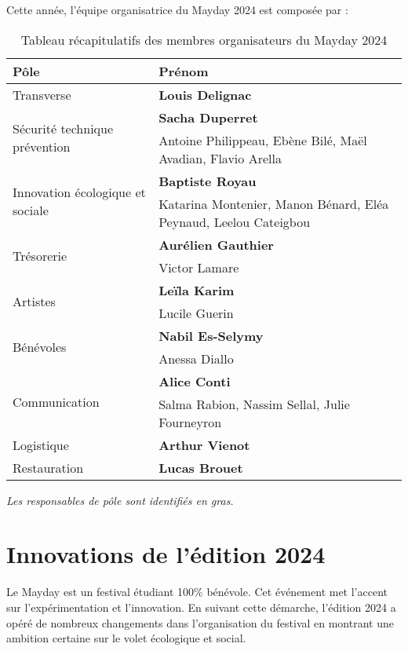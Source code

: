 \documentclass[12pt,a4paper]{report}
\begin{document}
\newpage
Cette année, l'équipe organisatrice du Mayday 2024 est composée par :

\begin{table}[h!]
\centering
\begin{tabular}{|m{3cm}|m{10cm}|}
\hline
Pôle & Prénom \\ 
 \hline\hline
Transverse & \textbf{Louis Delignac}\\ 
\hline
\multirow{2}{10em}{Sécurité technique prévention} & \textbf{Sacha Duperret} \\ 
& Antoine Philippeau, Ebène Bilé, Maël Avadian, Flavio Arella\\ 
 \hline
 \multirow{2}{5em}{Innovation écologique et sociale} & \textbf{Baptiste Royau} \\ 
& Katarina Montenier, Manon Bénard, Eléa Peynaud, Leelou Cateigbou\\
 \hline
 \multirow{2}{5em}{Trésorerie} & \textbf{Aurélien Gauthier} \\ 
& Victor Lamare\\
 \hline
 \multirow{2}{5em}{Artistes} & \textbf{Leïla Karim} \\
& Lucile Guerin\\
 \hline
\multirow{2}{5em}{Bénévoles} & \textbf{Nabil Es-Selymy} \\ 
& Anessa Diallo\\
 \hline
\multirow{2}{7em}{Communication} & \textbf{Alice Conti} \\ 
& Salma Rabion, Nassim Sellal, Julie Fourneyron\\
 \hline
 \multirow{1}{5em}{Logistique} & \textbf{Arthur Vienot} \\ 
 \hline
 \multirow{1}{5em}{Restauration} & \textbf{Lucas Brouet} \\ 
 \hline
\end{tabular}
\caption{Tableau récapitulatifs des membres organisateurs du Mayday 2024}
\label{tab:team}
\end{table}

\textit{Les responsables de pôle sont identifiés en gras.}

\chapter{Innovations de l'édition 2024}

Le Mayday est un festival étudiant 100\% bénévole. Cet événement met l’accent sur l’expérimentation et l’innovation. En suivant cette démarche, l’édition 2024 a opéré de nombreux changements dans l’organisation du festival en montrant une ambition certaine sur le volet écologique et social.
\end{document}
